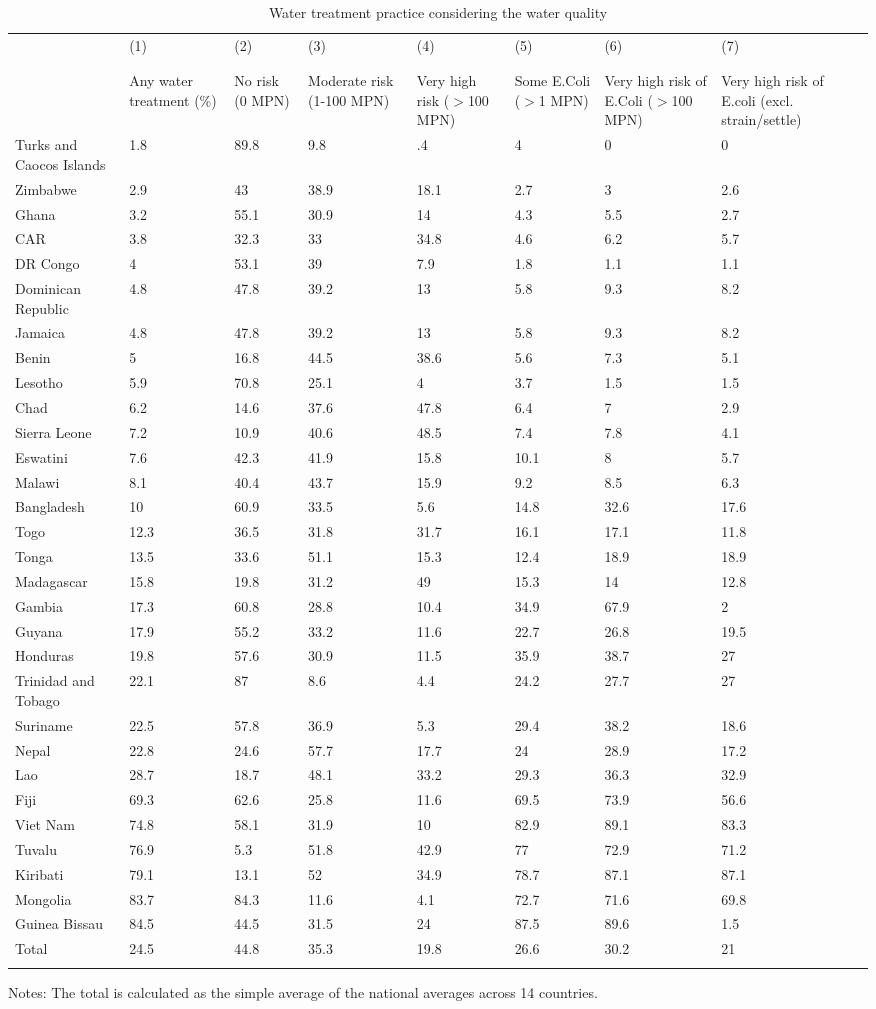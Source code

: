 \begin{table}[htbp] \centering
{}

\caption{Water treatment practice considering the water quality}
\label{TreatRisk}
\begin{tabularx}{\linewidth}{lCCCCCCC}

\toprule
& (1) & (2) & (3) & (4) & (5) & (6) & (7) \\ &&& \\ \cmidrule(lr){3-5} \cmidrule(lr){6-8} \tabularnewline
{}&{Any water treatment (\%)}&{No risk (0 MPN)}&{Moderate risk (1-100 MPN)}&{Very high risk ($>$100 MPN)}&{Some E.Coli ($>$1 MPN)}&{Very high risk of E.Coli ($>$100 MPN)}&{Very high risk of E.coli (excl. strain/settle)} \tabularnewline
\midrule \addlinespace[\belowrulesep]
Turks and Caocos Islands&1.8&89.8&9.8&.4&4&0&0 \tabularnewline
Zimbabwe&2.9&43&38.9&18.1&2.7&3&2.6 \tabularnewline
Ghana&3.2&55.1&30.9&14&4.3&5.5&2.7 \tabularnewline
CAR&3.8&32.3&33&34.8&4.6&6.2&5.7 \tabularnewline
DR Congo&4&53.1&39&7.9&1.8&1.1&1.1 \tabularnewline
Dominican Republic&4.8&47.8&39.2&13&5.8&9.3&8.2 \tabularnewline
Jamaica&4.8&47.8&39.2&13&5.8&9.3&8.2 \tabularnewline
Benin&5&16.8&44.5&38.6&5.6&7.3&5.1 \tabularnewline
Lesotho&5.9&70.8&25.1&4&3.7&1.5&1.5 \tabularnewline
Chad&6.2&14.6&37.6&47.8&6.4&7&2.9 \tabularnewline
Sierra Leone&7.2&10.9&40.6&48.5&7.4&7.8&4.1 \tabularnewline
Eswatini&7.6&42.3&41.9&15.8&10.1&8&5.7 \tabularnewline
Malawi&8.1&40.4&43.7&15.9&9.2&8.5&6.3 \tabularnewline
Bangladesh&10&60.9&33.5&5.6&14.8&32.6&17.6 \tabularnewline
Togo&12.3&36.5&31.8&31.7&16.1&17.1&11.8 \tabularnewline
Tonga&13.5&33.6&51.1&15.3&12.4&18.9&18.9 \tabularnewline
Madagascar&15.8&19.8&31.2&49&15.3&14&12.8 \tabularnewline
Gambia&17.3&60.8&28.8&10.4&34.9&67.9&2 \tabularnewline
Guyana&17.9&55.2&33.2&11.6&22.7&26.8&19.5 \tabularnewline
Honduras&19.8&57.6&30.9&11.5&35.9&38.7&27 \tabularnewline
Trinidad and Tobago&22.1&87&8.6&4.4&24.2&27.7&27 \tabularnewline
Suriname&22.5&57.8&36.9&5.3&29.4&38.2&18.6 \tabularnewline
Nepal&22.8&24.6&57.7&17.7&24&28.9&17.2 \tabularnewline
Lao&28.7&18.7&48.1&33.2&29.3&36.3&32.9 \tabularnewline
Fiji&69.3&62.6&25.8&11.6&69.5&73.9&56.6 \tabularnewline
Viet Nam&74.8&58.1&31.9&10&82.9&89.1&83.3 \tabularnewline
Tuvalu&76.9&5.3&51.8&42.9&77&72.9&71.2 \tabularnewline
Kiribati&79.1&13.1&52&34.9&78.7&87.1&87.1 \tabularnewline
Mongolia&83.7&84.3&11.6&4.1&72.7&71.6&69.8 \tabularnewline
Guinea Bissau&84.5&44.5&31.5&24&87.5&89.6&1.5 \tabularnewline
Total&24.5&44.8&35.3&19.8&26.6&30.2&21 \tabularnewline
\bottomrule \addlinespace[\belowrulesep]

\end{tabularx}
\begin{flushleft}
\footnotesize Notes: The total is calculated as the simple average of the national averages across 14 countries.
\end{flushleft}
\end{table}
